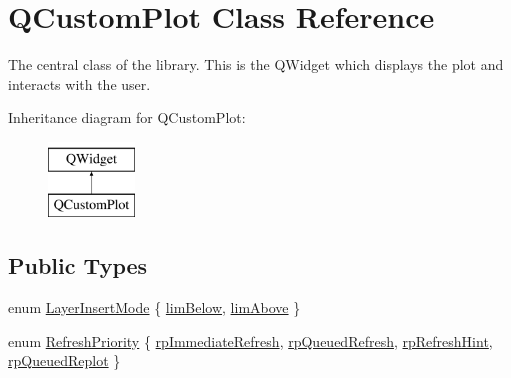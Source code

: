 \hypertarget{class_q_custom_plot}{}\section{Q\+Custom\+Plot Class Reference}
\label{class_q_custom_plot}


The central class of the library. This is the Q\+Widget which displays the plot and interacts with the user.  


Inheritance diagram for Q\+Custom\+Plot\+:\begin{figure}[H]
\begin{center}
\leavevmode
\includegraphics[height=2.000000cm]{class_q_custom_plot}
\end{center}
\end{figure}
\subsection*{Public Types}
\begin{DoxyCompactItemize}
\item 
enum \hyperlink{class_q_custom_plot_a75a8afbe6ef333b1f3d47abb25b9add7}{Layer\+Insert\+Mode} \{ \hyperlink{class_q_custom_plot_a75a8afbe6ef333b1f3d47abb25b9add7aee39cf650cd24e68552da0b697ce4a93}{lim\+Below}, 
\hyperlink{class_q_custom_plot_a75a8afbe6ef333b1f3d47abb25b9add7a062b0b7825650b432a713c0df6742d41}{lim\+Above}
 \}
\item 
enum \hyperlink{class_q_custom_plot_a45d61392d13042e712a956d27762aa39}{Refresh\+Priority} \{ \hyperlink{class_q_custom_plot_a45d61392d13042e712a956d27762aa39aa6eda645ccf1a60635df3e8b71ea6ae2}{rp\+Immediate\+Refresh}, 
\hyperlink{class_q_custom_plot_a45d61392d13042e712a956d27762aa39acd6f1e590ea775d1ddee666428077f3e}{rp\+Queued\+Refresh}, 
\hyperlink{class_q_custom_plot_a45d61392d13042e712a956d27762aa39a49666a5854a68dbcca8b277b03331260}{rp\+Refresh\+Hint}, 
\hyperlink{class_q_custom_plot_a45d61392d13042e712a956d27762aa39a019650c6ddf308f97e811fbfff207a8f}{rp\+Queued\+Replot}
 \}
\end{DoxyCompactItemize}
